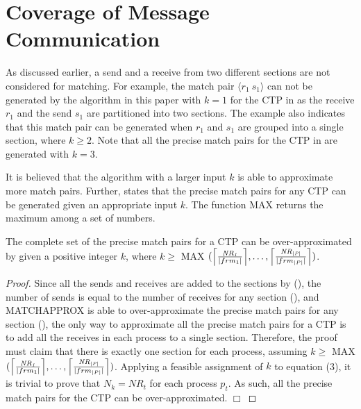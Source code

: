 \section{Coverage of Message Communication}

As discussed earlier, a send and a receive from two different sections are not considered for matching. For example, the match pair  $\langle r_1\ s_1\rangle$ can not be generated by the algorithm in this paper with $k=1$ for the CTP in  as the receive $r_1$ and the send $s_1$ are partitioned into two sections. The example also indicates that this match pair can be generated when $r_1$ and $s_1$ are grouped into a single section, where $k\geq2$.  
Note that all the precise match pairs for the CTP in  are generated with $k=3$.

It is believed that the algorithm with a larger input $k$ is able to approximate more match pairs. Further,  states that the precise match pairs for any CTP can be generated given an appropriate input $k$.
The function $\mathrm{MAX}$ returns the maximum among a set of numbers.
 
\begin{theorem}
The complete set of the precise match pairs for a CTP can be over-approximated by  given a positive integer $k$, where $k \geq$ $\mathrm{MAX}$ $(\ceil*{\frac{\mathit{NR_{1}}}{|frm_1|}},\ldots,\ceil*{\frac{\mathit{NR_{|P|}}}{|frm_{|P|}|}})$.
\label{theorem:precise}
\end{theorem}
\begin{proof}
Since all the sends and receives are added to the sections by  (), the number of sends is equal to the number of receives for any section (), and \textrm{MATCHAPPROX} is able to over-approximate the precise match pairs for any section (), the only way to approximate all the precise match pairs for a CTP is to add all the receives in each process to a single section. Therefore, the proof must claim that there is exactly one section for each process, assuming $k \geq$ $\mathrm{MAX}$ $(\ceil*{\frac{\mathit{NR_{1}}}{|frm_1|}},\ldots,\ceil*{\frac{\mathit{NR_{|P|}}}{|frm_{|P|}|}})$. Applying a feasible assignment of $k$ to equation (3), it is trivial to prove that $N_k = \mathit{NR_{t}}$ for each process $p_t$. As such, all the precise match pairs for the CTP can be over-approximated.
$\Box$
\end{proof}

